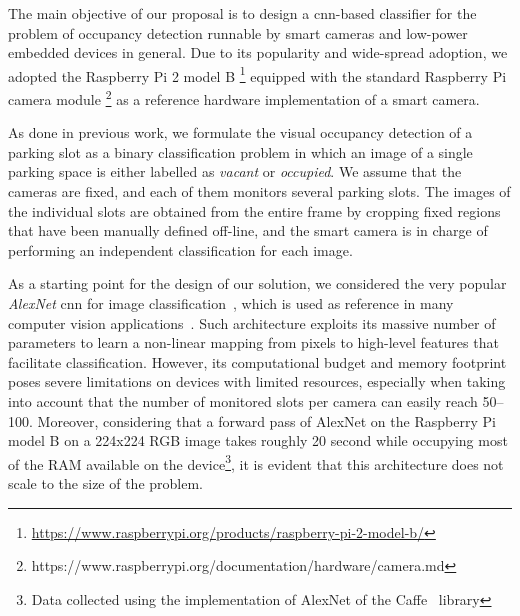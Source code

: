 \noindent The main objective of our proposal is to design a \gls{cnn}-based classifier for the problem of occupancy detection runnable by smart cameras and low-power embedded devices in general.
Due to its popularity and wide-spread adoption, we adopted the Raspberry Pi 2 model B \footnote{\url{https://www.raspberrypi.org/products/raspberry-pi-2-model-b/}} equipped with the standard Raspberry Pi camera module \footnote{{https://www.raspberrypi.org/documentation/hardware/camera.md}} as a reference hardware implementation of a smart camera.

As done in previous work, we formulate the visual occupancy detection of a parking slot as a binary classification problem in which an image of a single parking space is either labelled as \emph{vacant} or \emph{occupied}.
We assume that the cameras are fixed, and each of them monitors several parking slots.
The images of the individual slots are obtained from the entire frame by cropping fixed regions that have been manually defined off-line, and the smart camera is in charge of performing an independent classification for each image.

As a starting point for the design of our solution, we considered the very popular \emph{AlexNet} \gls{cnn} for image classification~\cite{krizhevsky2012imagenet}, which is used as reference in many computer vision applications~\cite{}.
Such architecture exploits its massive number of parameters to learn a non-linear mapping from pixels to high-level features that facilitate classification.
However, its computational budget and memory footprint poses severe limitations on devices with limited resources,
especially when taking into account that the number of monitored slots per camera can easily reach 50--100.
Moreover, considering that a forward pass of AlexNet on the Raspberry Pi model B on a 224x224 RGB image takes roughly 20 second while occupying most of the RAM available on the device\footnote{Data collected using the implementation of AlexNet of the Caffe~\cite{jia2014caffe} library}, it is evident that this architecture does not scale to the size of the problem.

